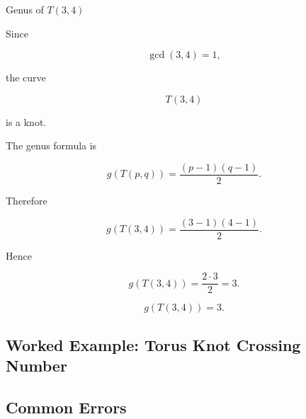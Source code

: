 \begin{workedexamplebox}{Genus of \(T(3,4)\)}

Since

\[
\gcd(3,4)=1,
\]

the curve

\[
T(3,4)
\]

is a knot.

The genus formula is

\[
g(T(p,q))
=
\frac{(p-1)(q-1)}{2}.
\]

Therefore

\[
g(T(3,4))
=
\frac{(3-1)(4-1)}{2}.
\]

Hence

\[
g(T(3,4))
=
\frac{2\cdot3}{2}
=
3.
\]

\begin{answerbox}
\[
\boxed{
g(T(3,4))=3.
}
\]
\end{answerbox}
\end{workedexamplebox}

\subsection{Worked Example: Torus Knot Crossing Number}
\label{subsec:worked-torus-crossing-number}


\subsection{Common Errors}
\label{subsec:knot-theory-common-errors}


